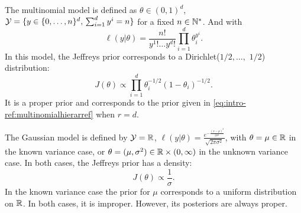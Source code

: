 \begin{ex}
    The multinomial model is defined as $\theta\in(0,1)^d$, $\mathcal{Y}=\{y\in\{0,\dots,n\}^d,\,\sum_{i=1}^dy^i=n\} $ for a fixed $n\in\mathbb{N}^\ast$.
    And with 
        \begin{equation}
            \ell(y|\theta) = \frac{n!}{y^1!\dots y^d!}\prod_{i=1}^d\theta_i^{y^i}.
        \end{equation}
    In this model, the Jeffreys prior corresponds to a Dirichlet($1/2,\dots,$ $1/2$) distribution:
        \begin{equation}
            J(\theta)\propto \prod_{i=1}^d\theta_i^{-1/2}(1-\theta_i)^{-1/2}.
        \end{equation}
    It is a proper prior and corresponds to the prior given in \cref{eq:intro-ref:multinomialhierarref} when $r=d$.  
\end{ex}

\begin{ex}
    The Gaussian model is defined by $\mathcal{Y}=\mathbb{R}$, $\ell(y|\theta) = \frac{e^{-\frac{(x-\mu)^2}{2\sigma^2}}}{\sqrt{2\pi\sigma^2}} $, with $\theta=\mu\in\mathbb{R} $ in the known variance case, or $\theta=(\mu,\sigma^2)\in\mathbb{R}\times(0,\infty) $ in the unknown variance case.
    In both cases, the Jeffreys prior has a density:
        \begin{equation}
            J(\theta)\propto \frac{1}{\sigma}.
        \end{equation}    
    In the known variance case the prior for $\mu$ corresponds to a uniform distribution on $\mathbb{R}$. In both cases, it is improper.  However, its posteriors are always proper.
\end{ex}




